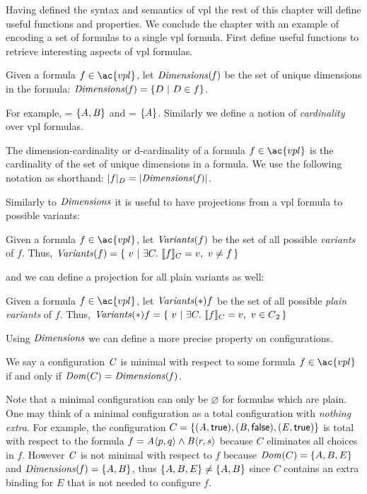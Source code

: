 \label{section:vpl:formalism}
%
Having defined the syntax and semantics of \ac{vpl} the rest of this chapter
will define useful functions and properties. We conclude the chapter with an
example of encoding a set of \pl{} formulas to a single \ac{vpl} formula.
%
First define useful functions to retrieve interesting aspects of \ac{vpl}
formulas.

\begin{definition}[Dimensions]
  Given a formula $f \in \ac{vpl}$, let $\mathit{Dimensions(f)}$ be the set of unique
  dimensions in the formula:  $\mathit{Dimensions(f)} = \{ D\ |\ D \in f \}$.
\end{definition}

For example,  = $\{\mathit{A,B}\}$ and
 = $\{\mathit{A}\}$.
%
Similarly we define a notion of \emph{cardinality} over \ac{vpl} formulas.
%
\begin{definition}
  The dimension-cardinality or d-cardinality of a formula $f \in \ac{vpl}$ is
  the cardinality of the set of unique dimensions in a formula. We use the
  following notation as shorthand: $|f|_{D} = |{\mathit{Dimensions(f)}}|$.
\end{definition}

Similarly to $\mathit{Dimensions}$ it is useful to have projections from a \ac{vpl}
formula to possible variants:
%
\begin{definition}[Variants]
  Given a formula $f \in \ac{vpl}$, let $\mathit{Variants}(f)$ be the set of all
  possible \emph{variants} of $f$. Thus, $\variants{f} = \{\ v\ |\ \exists
  C.\ \sem[C]{f} = v,\ v \neq f \,\}$
\end{definition}
%
and we can define a projection for all plain variants as well:
%
\begin{definition}[\pl{} Variants]
  Given a formula $f \in \ac{vpl}$, let $\mathit{Variants}(*){f}$ be the set of all
  possible \emph{plain variants} of $f$. Thus, $\variants*{f} = \{\ v\ |\ \exists C.\
  \sem[C]{f} = v,\ v \in \pl{} \,\}$
\end{definition}
%
Using $\mathit{Dimensions}$ we can define a more precise property on configurations.
%
\begin{definition}
  We say a configuration $\mathit{C}$ is minimal with respect to some formula $f \in
  \ac{vpl}$ if and only if $\mathit{Dom}({C}) = \mathit{Dimensions(\mathit{f})}$.
\end{definition}

Note that a minimal configuration can only be $\varnothing$ for formulas which
are plain. One may think of a minimal configuration as a total configuration
with \emph{nothing extra}. For example, the configuration $C = \{\kf{(A,\true),
  (B,\false),(E,\true)}\}$ is total with respect to the formula $f =
\chc[A]{p,q}\wedge\chc[B]{r,s}$ because $C$ eliminates all choices in $f$.
However $\mathit{C}$ is not minimal with respect to $f$ because $\domain{C} =
\set{A, B, E}$ and $\kf{Dimensions(\kf{f})} = \set{A,B}$, thus $\set{A,B,E} \neq
\set{A,B}$ since $C$ contains an extra binding for $E$ that is not needed to
configure $f$.

